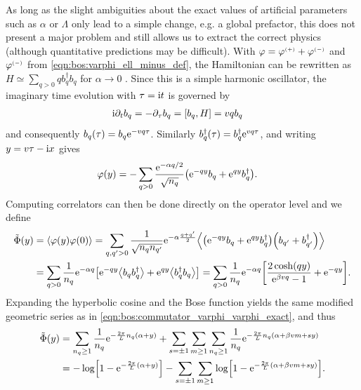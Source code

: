 As long as the slight ambiguities about the exact values of artificial parameters such as $\alpha$ or $\Lambda$ only lead to a simple change, e.g. a global prefactor, this does not present a major problem and still allows us to extract the correct physics (although quantitative predictions may be difficult). %
With $\varphi = \varphi\eplus + \varphi\eminus$ and $\varphi\eminus$ from \autoref{eqn:bos:varphi_ell_minus_def}, the Hamiltonian can be rewritten as $H\simeq\sum_{q>0} q b_q^\dagger b_q$ for $\alpha\rightarrow 0$ \cite{Bosonization_DelftSchoeller_1998}.
Since this is a simple harmonic oscillator, the imaginary time evolution with $\tau=\i t$ is governed by
\begin{align*}
\i\partial_t b_q &= -\partial_\tau b_q = \klb*{b_q,H} = vqb_q
\end{align*}
and consequently $b_q(\tau) = b_q \powe{-vq\tau}$.
Similarly $b_q^\dagger(\tau) = b_q^\dagger \powe{vq\tau}$, and writing $y=v\tau - \i x$ gives
\begin{align}
\varphi(y) &= -\sum_{q>0} \frac{\powe{-\alpha q/2}}{\sqrt{n_q}} \kla*{\powe{-qy} b_q + \powe{qy} b_q^\dagger}. \label{eqn:bos:varphi_ell_of_yalpha}
\end{align}%
Computing correlators can then be done directly on the operator level and we define
\begin{align*}
\tilde{\Phi}(y) &= \bra*{\varphi(y) \varphi(0)} = \sum_{q,q'>0} \frac{1}{\sqrt{n_qn_{q'}}} \powe{-\alpha \frac{q+q'}{2}} \bra*{\kla*{\powe{-qy} b_q + \powe{qy} b_q^\dagger} \kla*{b_{q'} + b_{q'}^\dagger}}\\
&= \sum_{q>0} \frac{1}{n_q} \powe{-\alpha q} \klb*{\powe{-qy}\bra[\big]{b_q b_q^\dagger} + \powe{qy}\bra[\big]{b_q^\dagger b_q}}= \sum_{q>0} \frac{1}{n_q} \powe{-\alpha q} \klb*{\frac{2\cosh(qy)}{\powe{\beta vq} - 1} + \powe{-qy}}.
\end{align*}
Expanding the hyperbolic cosine and the Bose function yields the same modified geometric series as in \autoref{eqn:bos:commutator_varphi_varphi_exact}, and thus
\begin{align*}
\tilde{\Phi}(y) &= \sum_{n_q\ge 1} \frac{1}{n_q} \powe{- \frac{2\pi}{L} n_q(\alpha + y)} + \sum_{s=\pm 1} \sum_{m\ge 1} \sum_{n_q\ge 1} \frac{1}{n_q} \powe{-\frac{2\pi}{L} n_q (\alpha + \beta vm + sy)}\\
&= -\log\klb*{1 - \powe{-\frac{2\pi}{L}(\alpha + y)}} - \sum_{s=\pm 1} \sum_{m\ge 1} \log\klb*{1 - \powe{-\frac{2\pi}{L} (\alpha + \beta vm + sy)}}.
\end{align*}
